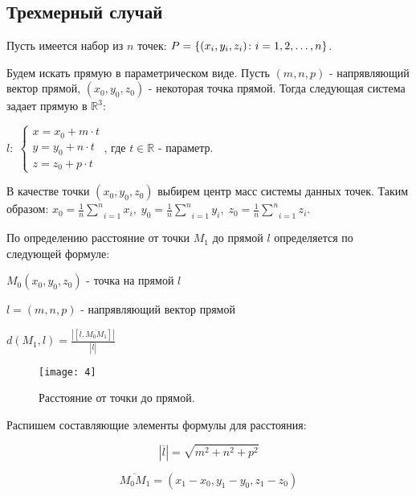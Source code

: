 \newpage
\subsection{Трехмерный случай}\label{line:alg:3dim}

Пусть имеется набор из $n$ точек: $P = \left\{(x_i, y_i, z_i)\colon i=1,2,\dots,n\right\}$. 

Будем искать прямую в параметрическом виде. Пусть $(m, n, p)$ - напрявляющий вектор прямой, $(x_0, y_0, z_0)$ - некоторая точка прямой. Тогда следующая система задает прямую в $\mathbb{R}^3$: 

\begin{center}
	$\mathit{l}: \; \begin{cases}
		x = x_0 + m \cdot t \\
		y = y_0 + n \cdot t \\
		z = z_0 + p \cdot t
	\end{cases}$, где $t \in \mathbb{R}$ - параметр. 
\end{center}

В качестве точки $(x_0, y_0, z_0)$ выбирем центр масс системы данных точек. Таким образом:
$x_0 = \frac{1}{n}\underset{i=1}{\overset{n}{\sum}} x_i, \; y_0 = \frac{1}{n}\underset{i=1}{\overset{n}{\sum}} y_i, \; z_0 = \frac{1}{n}\underset{i=1}{\overset{n}{\sum}} z_i$.

По определению расстояние от точки $M_1$ до прямой $\mathit{l}$ определяется по следующей формуле:

$M_0 (x_0, y_0, z_0)$ - точка на прямой $\mathit{l}$

$\mathit{l} = (m, n, p)$ - напрявляющий вектор прямой

\begin{center}
	$d (M_1, \mathit{l}) = \frac{|[\overline{\mathit{l}}, \overline{M_0 M_1}]|}{|\overline{\mathit{l}}|}$
\end{center}

\begin{center}
	\begin{figure}[h]
	{ 	
		\noindent 
		\centering
		\texttt{[image: 4]}
		\caption{Расстояние от точки до прямой.}
	}
\end{figure}
\end{center}

Распишем составляющие элементы формулы для расстояния:

$$|\overline{l}| = \sqrt{m^2 + n^2 + p^2}$$

$$\overline{M_0 M_1} = (x_1 - x_0, y_1 - y_0, z_1 - z_0)$$

